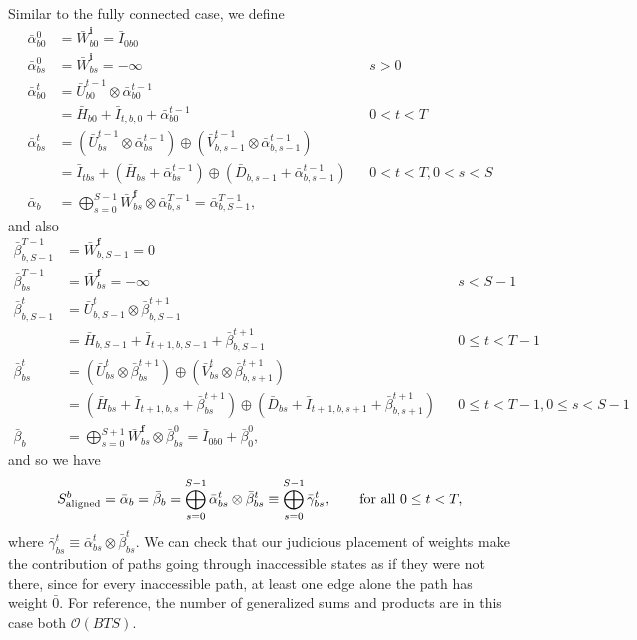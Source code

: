 \documentclass[a4paper]{article}
\begin{document}
Similar to the fully connected case, we define
\begin{align}
\bar\alpha^0_{b0} &= \bar{W}^{\mathbf{i}}_{b0} =\bar{I}_{0b0} \\
\bar\alpha^0_{bs} &= \bar{W}^{\mathbf{i}}_{bs} =-\infty && s>0\\
\bar\alpha^t_{b0} &= \bar{U}^{t-1}_{b0}\otimes\bar\alpha^{t-1}_{b0} 
\\
&=\bar{H}_{b0}+\bar{I}_{t,b,0}+\bar\alpha^{t-1}_{b0} && 0<t<T \\
\bar\alpha^t_{bs} &= (\bar{U}^{t-1}_{bs} \otimes\bar\alpha^{t-1}_{bs})\oplus (\bar{V}^{t-1}_{b,s-1} \otimes\bar\alpha^{t-1}_{b,s-1}) \\
&= \bar{I}_{tbs} + (\bar{H}_{bs} + \bar\alpha^{t-1}_{bs})\oplus (\bar{D}_{b, s-1} + \bar\alpha^{t-1}_{b,s-1}) && 0 < t < T, 0<s<S \\
\bar\alpha_b &= \bigoplus_{s=0}^{S-1} \bar{W}^{\mathbf{f}}_{bs} \otimes \bar\alpha^{T-1}_{b,s} = \bar\alpha^{T-1}_{b,S-1},
\end{align}
and also
\begin{align}
\bar\beta^{T-1}_{b,S-1} &= \bar{W}^{\mathbf{f}}_{b,S-1} =0 \\
\bar\beta^{T-1}_{bs} &= \bar{W}^{\mathbf{f}}_{bs} =-\infty && s<S-1\\
\bar\beta^t_{b,S-1} &= \bar{U}^{t}_{b,S-1}\otimes\bar\beta^{t+1}_{b,S-1} 
\\
&=\bar{H}_{b,S-1}+\bar{I}_{t+1,b,S-1}+\bar\beta^{t+1}_{b,S-1} && 0\leq t<T-1 \\
\bar\beta^t_{bs} &= (\bar{U}^{t}_{bs} \otimes\bar\beta^{t+1}_{bs})\oplus (\bar{V}^{t}_{bs} \otimes\bar\beta^{t+1}_{b,s+1}) \\
&= (\bar{H}_{bs} + \bar{I}_{t+1,b,s} + \bar\beta^{t+1}_{bs})\oplus (\bar{D}_{bs} + \bar{I}_{t+1,b, s+1} + \bar\beta^{t+1}_{b,s+1}) && 0 \leq t < T-1, 0\leq s<S-1 \\
\bar\beta_b &= \bigoplus_{s=0}^{S+1}\bar{W}^{\mathbf{f}}_{bs} \otimes \bar\beta^{0}_{bs} = \bar{I}_{0b0}  + \bar\beta^{0}_{0},
\end{align}
and so we have
\begin{equation}
S^b_{\rm{aligned}} = \bar\alpha_b = \bar\beta_b = \bigoplus_{s=0}^{S-1}\bar\alpha^t_{bs}\otimes \bar\beta^t_{bs}\equiv \bigoplus_{s=0}^{S-1}\bar\gamma^t_{bs},\qquad \textrm{for all } 0 \leq t < T,
\end{equation}
where $\bar\gamma^t_{bs} \equiv \bar\alpha^t_{bs}\otimes \bar\beta^t_{bs}$.
We can check that our judicious placement of weights make the contribution of paths going through inaccessible states as if they were not there, since for every inaccessible path, at least one edge alone the path has weight $\bar{0}$. For reference, the number of generalized sums and products are in this case both $\mathcal{O}(BTS)$.
\end{document}
